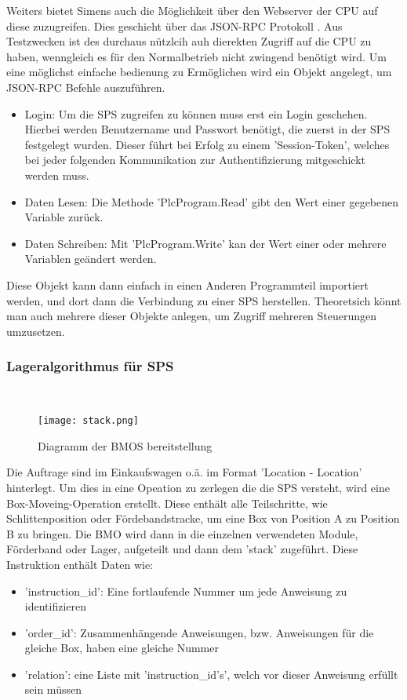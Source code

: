 Weiters bietet Simens auch die Möglichkeit über den Webserver der CPU auf diese zuzugreifen. Dies geschieht über das JSON-RPC Protokoll \cite{ws_s7}. Aus Testzwecken ist des durchaus nützlcih auh dierekten Zugriff auf die CPU zu haben, wenngleich es für den Normalbetrieb nicht zwingend benötigt wird. Um eine möglichst einfache bedienung zu Ermöglichen wird ein Objekt angelegt, um JSON-RPC Befehle auszuführen.

\begin{itemize}
    \item Login: Um die SPS zugreifen zu können muss erst ein Login geschehen. Hierbei werden Benutzername und Passwort benötigt, die zuerst in der SPS festgelegt wurden. Dieser führt bei Erfolg zu einem 'Session-Token', welches bei jeder folgenden Kommunikation zur Authentifizierung mitgeschickt werden muss.
    \item Daten Lesen: Die Methode 'PlcProgram.Read' gibt den Wert einer gegebenen Variable zurück.
    \item Daten Schreiben: Mit 'PlcProgram.Write' kan der Wert einer oder mehrere Variablen geändert werden.
\end{itemize}

Diese Objekt kann dann einfach in einen Anderen Programmteil importiert werden, und dort dann die Verbindung zu einer SPS herstellen. Theoretsich könnt man auch mehrere dieser Objekte anlegen, um Zugriff mehreren Steuerungen umzusetzen.

\subsubsection{Lageralgorithmus für SPS}\mbox{}\\

\begin{wrapfigure}{R}{0.6\textwidth}
    \centering
    \texttt{[image: stack.png]}
    \caption{Diagramm der BMOS bereitstellung}
\end{wrapfigure}

Die Auftrage sind im Einkaufswagen o.ä. im Format 'Location -\> Location' hinterlegt. Um dies in eine Opeation zu zerlegen die die SPS versteht, wird eine Box-Moveing-Operation erstellt. Diese enthält alle Teilschritte, wie Schlittenposition oder Fördebandstracke, um eine Box von Position A zu Position B zu bringen. 
Die BMO wird dann in die einzelnen verwendeten Module, Förderband oder Lager, aufgeteilt und dann dem 'stack' zugeführt. Diese Instruktion enthält Daten wie:
\begin{itemize}
    \item 'instruction\_id': Eine fortlaufende Nummer um jede Anweisung zu identifizieren
    \item 'order\_id': Zusammenhängende Anweisungen, bzw. Anweisungen für die gleiche Box, haben eine gleiche Nummer
    \item 'relation': eine Liste mit 'instruction\_id's', welch vor dieser Anweisung erfüllt sein müssen
\end{itemize} 

